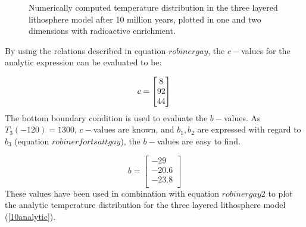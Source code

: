 \documentclass[10pt,a4paper]{article}
\begin{document}
\begin{figure} [H]
	\centering
	\caption{\label{10enriched}Numerically computed temperature distribution in the three layered lithosphere model after 10 million years, plotted in one and two dimensions with radioactive enrichment. }
\end{figure}


\noindent By using the relations described in equation $robinergay$, the $c-$values for the analytic expression can be evaluated to be:

\begin{equation}
c=\begin{bmatrix}
8\\
92\\
44\\
\end{bmatrix}\\
\vspace{0.5cm}
\end{equation}
The bottom boundary condition is used to evaluate the $b-$values. As$T_3(-120)=1300$, $c-$values are known, and $b_1,b_2$ are expressed with regard to $b_3$ (equation $robinerfortsattgay$), the $b-$values are easy to find.

\begin{equation}
b=\begin{bmatrix}
-29\\
-20.6\\
-23.8\\
\end{bmatrix}
\end{equation}
These values have been used in combination with equation $robinergay2$ to plot the analytic temperature distribution for the three layered lithosphere model (\ref{10analytic}). 
\end{document}
